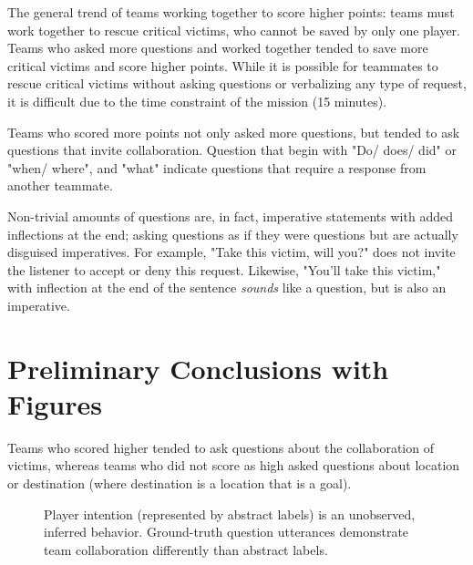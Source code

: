 The general trend of teams working together to score higher points: teams must work together to rescue critical victims, who cannot be saved by only one player. Teams who asked more questions and worked together tended to save more critical victims and score higher points. While it is possible for teammates to rescue critical victims without asking questions or verbalizing any type of request, it is difficult due to the time constraint of the mission (15 minutes). 


Teams who scored more points not only asked more questions, but tended to ask questions that invite collaboration. Question that begin with "Do/ does/ did" or "when/ where", and "what" indicate questions that require a response from another teammate. 

Non-trivial amounts of questions are, in fact, imperative statements with added inflections at the end; asking questions as if they were questions but are actually disguised imperatives. For example, "Take this victim, will you?" does not invite the listener to accept or deny this request. Likewise, "You'll take this victim," with inflection at the end of the sentence \textit{sounds} like a question, but is also an imperative. 






\newpage
\section{Preliminary Conclusions with Figures}
Teams who scored higher tended to ask questions about the collaboration of victims, whereas teams who did not score as high asked questions about location or destination (where destination is a location that is a goal).



\begin{figure}[h!]
    \centering
    \caption{Player intention (represented by abstract labels) is an unobserved, inferred behavior. Ground-truth question utterances demonstrate team collaboration differently than abstract labels.}
\end{figure}


